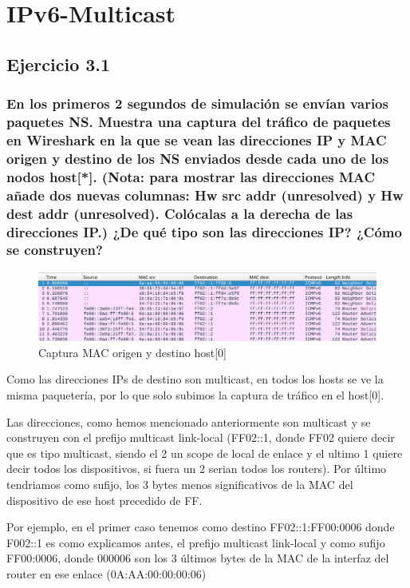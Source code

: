 \chapter{IPv6-Multicast}
\label{chap:ipv6_multicast}

\section{Ejercicio 3.1}
\subsection{En los primeros 2 segundos de simulación se envían varios paquetes NS. Muestra una captura del tráfico de
paquetes en Wireshark en la que se vean las direcciones IP y MAC origen y destino de los NS enviados desde
cada uno de los nodos host[*]. (Nota: para mostrar las direcciones MAC añade dos nuevas columnas: Hw src
addr (unresolved) y Hw dest addr (unresolved). Colócalas a la derecha de las direcciones IP.) ¿De qué tipo son
las direcciones IP? ¿Cómo se construyen?}

\begin{figure}[H]
    \centering
    \includegraphics[width=135mm, scale=0.75]{imaxes/captura_ejer3_1.png}
    \caption{Captura MAC origen y destino host[0]}
    \label{fig:ip_mac_host0}
\end{figure}

Como las direcciones IPs de destino son multicast, en todos los hosts se ve la misma paquetería, por lo que solo subimos la captura de tráfico en el host[0].

Las direcciones, como hemos mencionado anteriormente son multicast y se construyen con el prefijo multicast link-local (FF02::1, donde FF02 quiere decir que es tipo multicast, siendo el 2 un scope de local de enlace y el ultimo 1 quiere decir todos los dispositivos, si fuera un 2 serian todos los routers). Por último tendriamos como sufijo, los 3 bytes menos significativos de la MAC del dispositivo de ese host precedido de FF.

Por ejemplo, en el primer caso tenemos como destino FF02::1:FF00:0006 donde F002::1 es como explicamos antes, el prefijo multicast link-local y como sufijo FF00:0006, donde 000006 son los 3 últimos bytes de la MAC de la interfaz del router en ese enlace (0A:AA:00:00:00:06)


